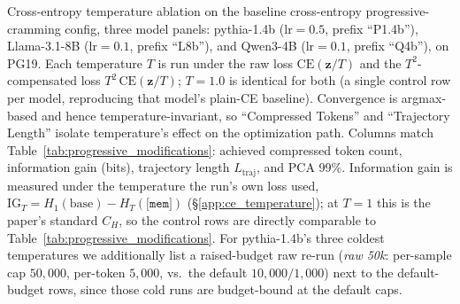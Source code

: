 \begin{table}[t]
    \centering
    \caption{Cross-entropy temperature ablation on the baseline cross-entropy progressive-cramming config, three model panels: pythia-1.4b ($\mathrm{lr}=0.5$, prefix ``P1.4b''), Llama-3.1-8B ($\mathrm{lr}=0.1$, prefix ``L8b''), and Qwen3-4B ($\mathrm{lr}=0.1$, prefix ``Q4b''), on PG19. Each temperature $T$ is run under the raw loss $\mathrm{CE}(\mathbf{z}/T)$ and the $T^2$-compensated loss $T^2\,\mathrm{CE}(\mathbf{z}/T)$; $T=1.0$ is identical for both (a single control row per model, reproducing that model's plain-CE baseline). Convergence is argmax-based and hence temperature-invariant, so ``Compressed Tokens'' and ``Trajectory Length'' isolate temperature's effect on the optimization path. Columns match Table~\ref{tab:progressive_modifications}: achieved compressed token count, information gain (bits), trajectory length $L_{\text{traj}}$, and PCA 99\%. Information gain is measured under the temperature the run's own loss used, $\mathrm{IG}_T = H_1(\text{base}) - H_T(\texttt{[mem]})$ (\S\ref{app:ce_temperature}); at $T{=}1$ this is the paper's standard $C_H$, so the control rows are directly comparable to Table~\ref{tab:progressive_modifications}. For pythia-1.4b's three coldest temperatures we additionally list a raised-budget raw re-run (\emph{raw 50k}: per-sample cap $50{,}000$, per-token $5{,}000$, vs.\ the default $10{,}000/1{,}000$) next to the default-budget rows, since those cold runs are budget-bound at the default caps.}
    \label{tab:progressive_temperature}
    \begin{small}
    \end{small}
\vskip -0.1in
\end{table}

